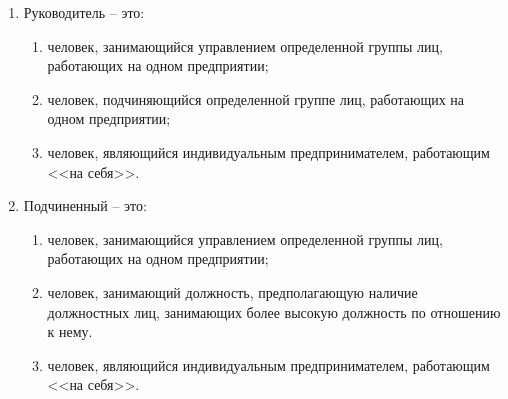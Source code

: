 \documentclass[12pt,pscyr]{hedwork}
\renewcommand{\labelenumii}{\asbuk{enumii})}
\newcommand{\itempo}{\stepcounter{enumii}\item[\bfseries\labelenumii]}
\begin{document}
\begin{enumerate}
    \item Руководитель -- это:
      \begin{enumerate}
        \itempo человек, занимающийся управлением определенной группы лиц,
          работающих на одном предприятии;
        \item человек, подчиняющийся определенной группе лиц, работающих на
          одном предприятии;
        \item человек, являющийся индивидуальным предпринимателем,
          работающим <<на себя>>.
      \end{enumerate}

    \item Подчиненный -- это:
      \begin{enumerate}
        \item человек, занимающийся управлением определенной группы лиц,
          работающих на одном предприятии;
        \itempo человек, занимающий должность, предполагающую наличие
          должностных лиц, занимающих более высокую должность по отношению к
          нему.
        \item человек, являющийся индивидуальным предпринимателем, работающим
          <<на себя>>.
      \end{enumerate}
  \end{enumerate}
\end{document}
